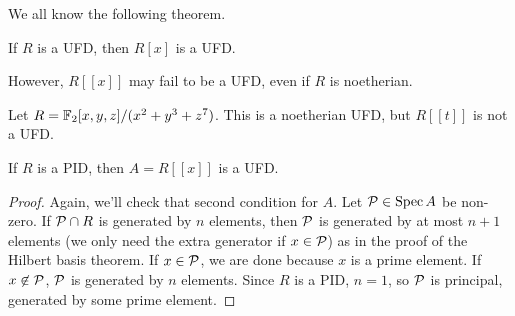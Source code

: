  We all know the following theorem.
 \begin{theorem}[Gauss]
   If $R$ is a UFD, then $R[x]$ is a UFD.
 \end{theorem}
 However, $R[[x]]$ may fail to be a UFD, even if $R$ is noetherian.
 \begin{example}
   Let $R=\FF_2[x,y,z]/(x^2+y^3+z^7)$. This is a noetherian UFD, but $R[[t]]$ is not a
   UFD.
 \end{example}
 \begin{theorem}
   If $R$ is a PID, then $A=R[[x]]$ is a UFD.
 \end{theorem}
 \begin{proof}
   Again, we'll check that second condition for $A$. Let $\P\in\spec A$ be non-zero. If
   $\P\cap R$ is generated by $n$ elements, then $\P$ is generated by at most $n+1$
   elements (we only need the extra generator if $x\in \P$) as in the proof of the
   Hilbert basis theorem. If $x\in \P$, we are done because $x$ is a prime element. If
   $x\not\in \P$, $\P$ is generated by $n$ elements. Since $R$ is a PID, $n=1$, so $\P$
   is principal, generated by some prime element.
 \end{proof}
